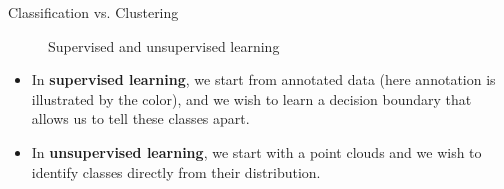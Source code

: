 \documentclass[xcolor=pdftex,dvipsnames,table]{beamer}
\begin{document}
\begin{frame}{Classification vs. Clustering}
	 \begin{figure}[htb]
   		\centering
   		 \hspace{1cm}
   		\caption{Supervised and unsupervised learning}
	 \end{figure}
	\begin{itemize}
		\item In {\bf supervised learning}, we start from annotated data (here annotation is illustrated by the color), and we wish to learn a decision boundary that allows us to tell these classes apart.
		\item In {\bf unsupervised learning}, we start with a point clouds and we wish to identify classes directly from their distribution. 
	\end{itemize}
\end{frame}
\end{document}
